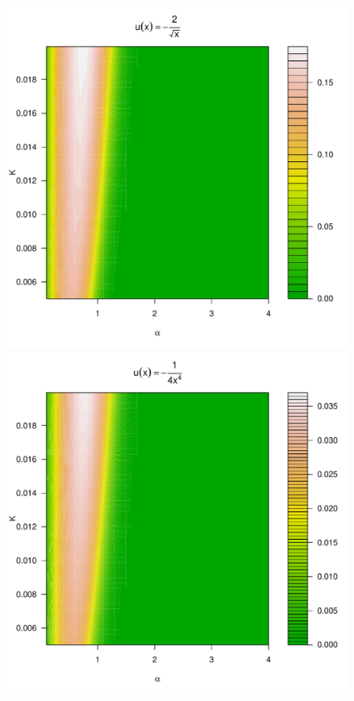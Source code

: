 \begin{figure}[htb!]
\begin{minipage}{0.25\linewidth}
  \end{minipage}\hfill
  \begin{minipage}{0.25\linewidth}
    \includegraphics[width=\textwidth]{phi_hat_pareto5e-1.pdf}    
  \end{minipage}\hfill
  \begin{minipage}{0.25\linewidth}
    \includegraphics[width=\textwidth]{phi_hat_pareto4.pdf}

\end{minipage}
\end{figure}
